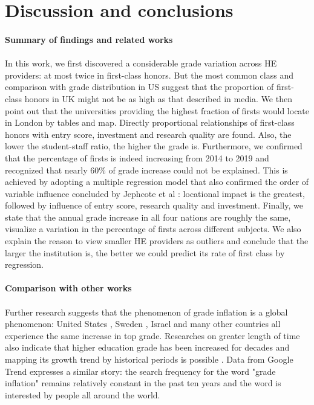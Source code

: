 \documentclass[11pt,a4paper]{article}
\begin{document}
\section{Discussion and conclusions}

\paragraph{Summary of findings and related works} 
\paragraph{}

In this work, we first discovered a considerable grade variation across HE providers: at most twice in first-class honors. But the most common class and comparison with grade distribution in US \cite{USTrend} suggest that the proportion of first-class honors in UK might not be as high as that described in media. We then point out that the universities providing the highest fraction of firsts would locate in London by tables and map. Directly proportional relationships of first-class honors with entry score, investment and research quality are found. Also, the lower the student-staff ratio, the higher the grade is. Furthermore, we confirmed that the percentage of firsts is indeed increasing from 2014 to 2019 and recognized that nearly 60\% of grade increase could not be explained. This is achieved by adopting a multiple regression model that also confirmed the order of variable influence concluded by Jephcote et al \cite{BayMain}: locational impact is the greatest, followed by influence of entry score, research quality and investment. Finally, we state that the annual grade increase in all four nations are roughly the same, visualize a variation in the percentage of firsts across different subjects. We also explain the reason to view smaller HE providers as outliers and conclude that the larger the institution is, the better we could predict its rate of first class by regression. 

\paragraph{Comparison with other works}
\paragraph{}

Further research suggests that the phenomenon of grade inflation is a global phenomenon: United States \cite{Rojstaczer2}, Sweden \cite{WIKSTROM2005309}, Israel \cite{doi} and many other countries all experience the same increase in top grade. Researches on greater length of time \cite{BayMain} \cite{Rojstaczer2} also indicate that higher education grade has been increased for decades and mapping its growth trend by historical periods is possible \cite{doi10}. Data from Google Trend \cite{GT} expresses a similar story: the search frequency for the word "grade inflation" remains relatively constant in the past ten years and the word is interested by people all around the world. 
\end{document}
